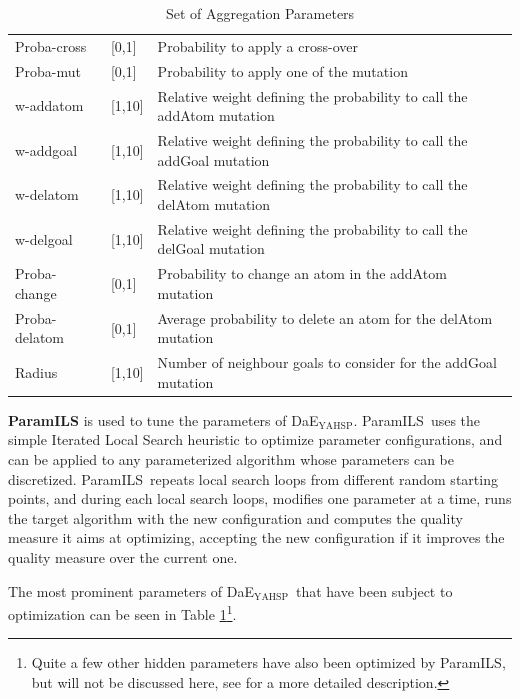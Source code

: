 \documentclass{llncs}
\newcommand{\DAEYAHSP}{{\sc DaE$_{\text{YAHSP}}$}}
\def\PARAMILS{{\sc ParamILS}}
\renewcommand{\paragraph}[1]{{\bf #1}}
\begin{document}
\begin{table}[tb!]
\begin{tabular}{|l|l|l|}
\hline
Proba-cross	&	[0,1]	&	 Probability to apply a cross-over\\	
Proba-mut	&	[0,1]	&	  Probability to apply one of the mutation\\	
\hline
w-addatom	&	[1,10]	&	  Relative weight defining the probability to call the addAtom mutation\\					
w-addgoal	&	[1,10]	&	  Relative weight defining the probability to call the addGoal mutation\\					
w-delatom	&	[1,10]	&	 Relative weight defining the probability to call the delAtom mutation\\					
w-delgoal	&	[1,10]	&	 Relative weight defining the probability to call the delGoal mutation\\												
\hline
Proba-change	&	[0,1]	&	  Probability to change an atom in the addAtom mutation\\							
Proba-delatom	&	[0,1]	&	 Average probability to delete an atom for the delAtom mutation\\								
Radius	&	[1,10]	&	  Number of neighbour goals to consider for the addGoal mutation\\		
\hline				
\end{tabular}
\caption{Set of Aggregation Parameters}
\label{tab:parameters}
\end{table}

\paragraph{\PARAMILS} \cite{hutter2009paramils} is used to tune the parameters of \DAEYAHSP. \PARAMILS\  uses the simple Iterated Local Search heuristic \cite{Lourencco2003} to optimize parameter configurations, and can be applied to any parameterized algorithm whose parameters can be discretized. \PARAMILS\ repeats local search loops from different random starting points, and during each local search loops, modifies one parameter at a time, runs the target algorithm with the new configuration and computes the quality measure it aims at optimizing, accepting the new configuration if it improves the quality measure over the current one.

The most prominent parameters of \DAEYAHSP\ that have been subject to optimization can be seen in Table \ref{tab:parameters}\footnote{Quite a few other hidden parameters have also been optimized by \PARAMILS, but will not be discussed here, see \cite{Bibai:2010:GPT:1830483.1830528} for a more detailed description.}.
\end{document}
